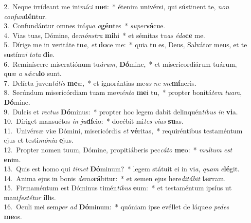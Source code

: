 {2.~}Neque irrídeant me ini\textit{mí}\textit{ci} \textbf{me}i:~* étenim univérsi, qui sústinent te, \textit{non} \textit{con}\textit{fun}\textbf{dén}tur.\\
{3.~}Confundántur omnes iní\textit{qua} \textit{a}\textbf{gén}tes~* \textit{su}\textit{per}\textbf{vá}cue.\\
{4.~}Vias tuas, Dómine, de\textit{món}\textit{stra} \textbf{mi}hi~* et sémitas tu\textit{as} \textit{é}\textit{do}\textbf{ce} me.\\
{5.~}Dírige me in veritáte tu\textit{a}, \textit{et} \textbf{do}ce me:~* quia tu es, Deus, Salvátor meus, et te sustínu\textit{i} \textit{to}\textit{ta} \textbf{di}e.\\
{6.~}Reminíscere miseratiónum tu\textit{á}\textit{rum}, \textbf{Dó}mine,~* et misericordiárum tuárum, quæ \textit{a} \textit{sǽ}\textit{cu}\textbf{lo} sunt.\\
{7.~}Delícta juven\textit{tú}\textit{tis} \textbf{me}æ,~* et ignorántias me\textit{as} \textit{ne} \textit{me}\textbf{mí}neris.\\
{8.~}Secúndum misericórdiam tuam me\textit{mén}\textit{to} \textbf{me}i tu,~* propter bonitá\textit{tem} \textit{tu}\textit{am}, \textbf{Dó}mine.\\
{9.~}Dulcis et \textit{re}\textit{ctus} \textbf{Dó}minus:~* propter hoc legem dabit delinquén\textit{ti}\textit{bus} \textit{in} \textbf{vi}a.\\
{10.~}Díriget mansuétos \textit{in} \textit{ju}\textbf{dí}cio:~* docébit mi\textit{tes} \textit{vi}\textit{as} \textbf{su}as.\\
{11.~}Univérsæ viæ Dómini, misericórdi\textit{a} \textit{et} \textbf{vé}ritas,~* requiréntibus testaméntum ejus et testi\textit{mó}\textit{ni}\textit{a} \textbf{e}jus.\\
{12.~}Propter nomen tuum, Dómine, propitiáberis pec\textit{cá}\textit{to} \textbf{me}o:~* \textit{mul}\textit{tum} \textit{est} \textbf{e}nim.\\
{13.~}Quis est homo qui \textit{ti}\textit{met} \textbf{Dó}minum?~* legem státuit ei in vi\textit{a}, \textit{quam} \textit{e}\textbf{lé}git.\\
{14.~}Anima ejus in bonis \textit{de}\textit{mo}\textbf{rá}bitur:~* et semen ejus here\textit{di}\textit{tá}\textit{bit} \textbf{ter}ram.\\
{15.~}Firmaméntum est Dóminus timén\textit{ti}\textit{bus} \textbf{e}um:~* et testaméntum ipsíus ut mani\textit{fe}\textit{sté}\textit{tur} \textbf{il}lis.\\
{16.~}Oculi mei sem\textit{per} \textit{ad} \textbf{Dó}minum:~* quóniam ipse evéllet de láque\textit{o} \textit{pe}\textit{des} \textbf{me}os.\\

